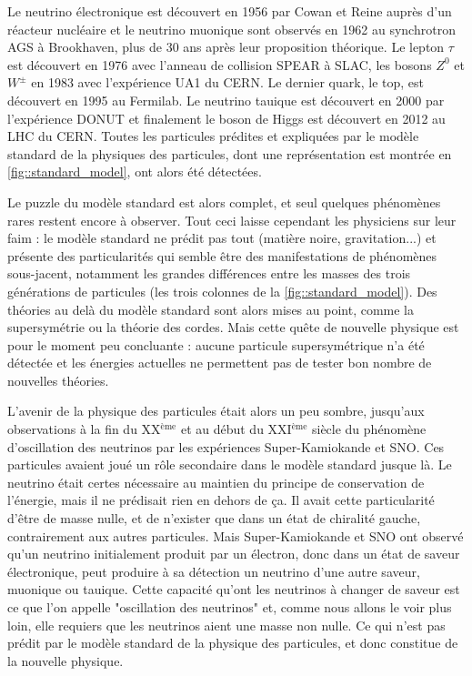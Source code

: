 		    Le neutrino électronique est découvert en 1956 par Cowan et Reine\cite{Cowan1956} auprès d'un réacteur nucléaire et le neutrino muonique sont observés en 1962\cite{Danby1962} au synchrotron AGS à Brookhaven, plus de 30 ans après leur proposition théorique. Le lepton $\tau$ est découvert en 1976\cite{Perl1975} avec l'anneau de collision SPEAR à SLAC, les bosons $Z^0$ et $W^{\pm}$ en 1983\cite{Arnison1983,Arnison1983a} avec l'expérience UA1 du CERN. Le dernier quark, le top, est découvert en 1995\cite{Collaboration1995} au Fermilab. Le neutrino tauique est découvert en 2000 par l'expérience DONUT\cite{Collaboration2000} et finalement le boson de Higgs est découvert en 2012 au LHC du CERN\cite{Collaboration2012}. Toutes les particules prédites et expliquées par le modèle standard de la physiques des particules, dont une représentation est montrée en \autoref{fig::standard_model}, ont alors été détectées. 
		    
		    Le puzzle du modèle standard est alors complet, et seul quelques phénomènes rares restent encore à observer. Tout ceci laisse cependant les physiciens sur leur faim : le modèle standard ne prédit pas tout (matière noire, gravitation...) et présente des particularités qui semble être des manifestations de phénomènes sous-jacent, notamment les grandes différences entre les masses des trois générations de particules (les trois colonnes de la \autoref{fig::standard_model}). Des théories au delà du modèle standard sont alors mises au point, comme la supersymétrie ou la théorie des cordes\cite{pdg2018}. Mais cette quête de nouvelle physique est pour le moment peu concluante : aucune particule supersymétrique n'a été détectée et les énergies actuelles ne permettent pas de tester bon nombre de nouvelles théories.
		    
		    L'avenir de la physique des particules était alors un peu sombre, jusqu'aux observations à la fin du XX$^{\text{ème}}$ et au début du XXI$^{\text{ème}}$ siècle du phénomène d'oscillation des neutrinos par les expériences Super-Kamiokande\cite{Fukuda1998} et SNO\cite{Aharmim2013}. Ces particules avaient joué un rôle secondaire dans le modèle standard jusque là. Le neutrino était certes nécessaire au maintien du principe de conservation de l'énergie, mais il ne prédisait rien en dehors de ça. Il avait cette particularité d'être de masse nulle, et de n'exister que dans un état de chiralité gauche, contrairement aux autres particules. Mais Super-Kamiokande et SNO ont observé qu'un neutrino initialement produit par un électron, donc dans un état de saveur électronique, peut produire à sa détection un neutrino d'une autre saveur, muonique ou tauique. Cette capacité qu'ont les neutrinos à changer de saveur est ce que l'on appelle "oscillation des neutrinos" et, comme nous allons le voir plus loin, elle requiers que les neutrinos aient une masse non nulle. Ce qui n'est pas prédit par le modèle standard de la physique des particules, et donc constitue de la nouvelle physique.
		    

